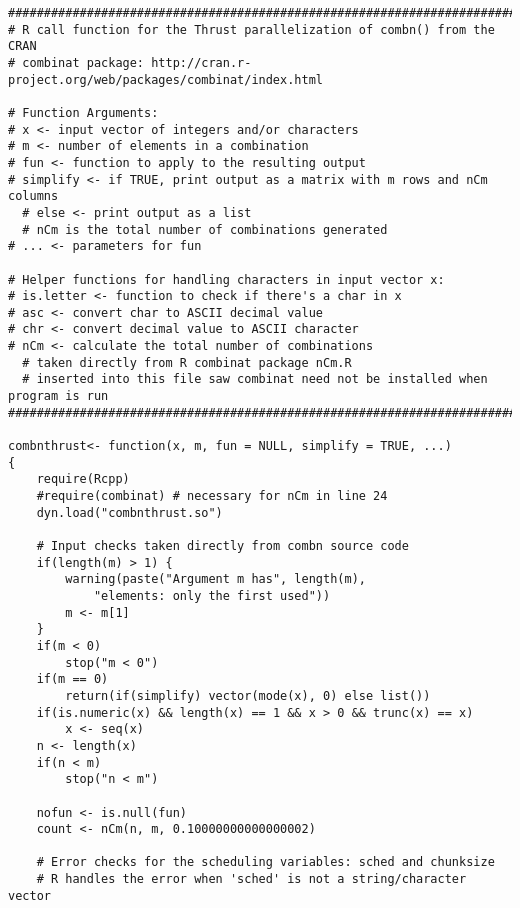 {

\begin{lstlisting}
####################################################################################
# R call function for the Thrust parallelization of combn() from the CRAN
# combinat package: http://cran.r-project.org/web/packages/combinat/index.html

# Function Arguments:
# x <- input vector of integers and/or characters
# m <- number of elements in a combination
# fun <- function to apply to the resulting output
# simplify <- if TRUE, print output as a matrix with m rows and nCm columns
  # else <- print output as a list 
  # nCm is the total number of combinations generated
# ... <- parameters for fun

# Helper functions for handling characters in input vector x:
# is.letter <- function to check if there's a char in x
# asc <- convert char to ASCII decimal value
# chr <- convert decimal value to ASCII character
# nCm <- calculate the total number of combinations 
  # taken directly from R combinat package nCm.R
  # inserted into this file saw combinat need not be installed when program is run
####################################################################################

combnthrust<- function(x, m, fun = NULL, simplify = TRUE, ...)
{
	require(Rcpp)
	#require(combinat) # necessary for nCm in line 24
	dyn.load("combnthrust.so")

	# Input checks taken directly from combn source code
	if(length(m) > 1) {
		warning(paste("Argument m has", length(m), 
			"elements: only the first used"))
		m <- m[1]
	}
	if(m < 0)
		stop("m < 0")
	if(m == 0)
		return(if(simplify) vector(mode(x), 0) else list())
	if(is.numeric(x) && length(x) == 1 && x > 0 && trunc(x) == x)
		x <- seq(x)
	n <- length(x)
	if(n < m)
		stop("n < m")

	nofun <- is.null(fun)
	count <- nCm(n, m, 0.10000000000000002)

	# Error checks for the scheduling variables: sched and chunksize
	# R handles the error when 'sched' is not a string/character vector
	

\end{lstlisting}}
